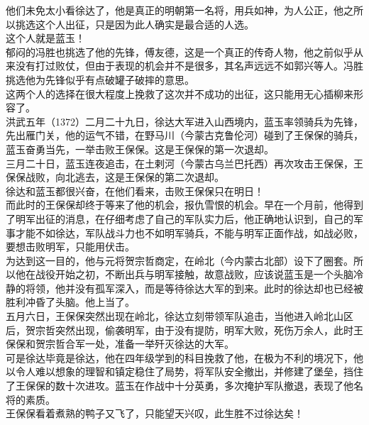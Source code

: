 \begin{multicols}{\theparacolNo}
他们未免太小看徐达了，他是真正的明朝第一名将，用兵如神，为人公正，他之所以挑选这个人出征，只是因为此人确实是最合适的人选。\\

这个人就是蓝玉！\\

郁闷的冯胜也挑选了他的先锋，傅友德，这是一个真正的传奇人物，他之前似乎从来没有打过败仗，但由于表现的机会并不是很多，其名声远远不如郭兴等人。冯胜挑选他为先锋似乎有点破罐子破摔的意思。\\

这两个人的选择在很大程度上挽救了这次并不成功的出征，这只能用无心插柳来形容了。\\

洪武五年（1372）二月二十九日，徐达大军进入山西境内，蓝玉率领骑兵为先锋，先出雁门关，他的运气不错，在野马川（今蒙古克鲁伦河）碰到了王保保的骑兵，蓝玉奋勇当先，一举击败王保保。这是王保保的第一次退却。\\

三月二十日，蓝玉连夜追击，在土剌河（今蒙古乌兰巴托西）再次攻击王保保，王保保战败，向北逃去，这是王保保的第二次退却。\\

徐达和蓝玉都很兴奋，在他们看来，击败王保保只在明日！\\

而此时的王保保却终于等来了他的机会，报仇雪恨的机会。早在一个月前，他得到了明军出征的消息，在仔细考虑了自己的军队实力后，他正确地认识到，自己的军事才能不如徐达，军队战斗力也不如明军骑兵，不能与明军正面作战，如战必败，要想击败明军，只能用伏击。\\

为达到这一目的，他与元将贺宗哲商定，在岭北（今内蒙古北部）设下了圈套。所以他在战役开始之初，不断出兵与明军接触，故意战败，应该说蓝玉是一个头脑冷静的将领，他并没有孤军深入，而是等待徐达大军的到来。此时的徐达却也已经被胜利冲昏了头脑。他上当了。\\

五月六日，王保保突然出现在岭北，徐达立刻带领军队追击，当他进入岭北山区后，贺宗哲突然出现，偷袭明军，由于没有提防，明军大败，死伤万余人，此时王保保和贺宗哲合军一处，准备一举歼灭徐达的大军。\\

可是徐达毕竟是徐达，他在四年级学到的科目挽救了他，在极为不利的境况下，他以令人难以想象的理智和镇定稳住了局势，将军队安全撤出，并修建了堡垒，挡住了王保保的数十次进攻。蓝玉在作战中十分英勇，多次掩护军队撤退，表现了他名将的素质。\\

王保保看着煮熟的鸭子又飞了，只能望天兴叹，此生胜不过徐达矣！\\


\end{multicols}
